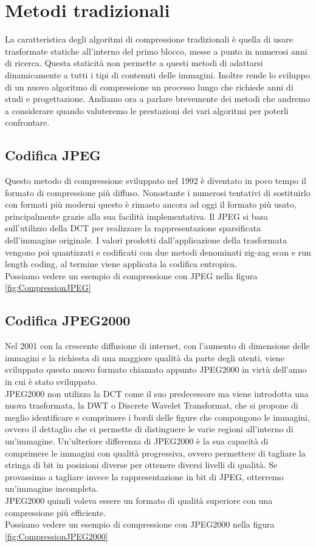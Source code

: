\chapter{Metodi tradizionali}
La caratteristica degli algoritmi di compressione tradizionali è quella di usare trasformate statiche all’interno del primo blocco, messe a punto in numerosi anni di ricerca. Questa staticità non permette a questi metodi di adattarsi dinamicamente a tutti i tipi di contenuti delle immagini. Inoltre rende lo sviluppo di un nuovo algoritmo di compressione un processo lungo che richiede anni di studi e progettazione. \cite{cheng2018deep}
Andiamo ora a parlare brevemente dei metodi che andremo a considerare quando valuteremo le prestazioni dei vari algoritmi per poterli confrontare.

\section{Codifica JPEG}
Questo metodo di compressione sviluppato nel 1992 è diventato in poco tempo il formato di compressione più diffuso. Nonostante i numerosi tentativi di sostituirlo con formati più moderni questo è rimasto ancora ad oggi il formato più usato, principalmente grazie alla sua facilità implementativa. Il JPEG si basa sull’utilizzo della DCT per realizzare la rappresentazione sparsificata dell’immagine originale. I valori prodotti dall'applicazione della trasformata vengono poi quantizzati e codificati con due metodi denominati zig-zag scan e run length coding, al termine viene applicata la codifica entropica. \cite{125072} \\
Possiamo vedere un esempio di compressione con JPEG nella figura \ref{fig:CompressionJPEG}

\section{Codifica JPEG2000}
Nel 2001 con la crescente diffusione di internet, con l’aumento di dimensione delle immagini e la richiesta di una maggiore qualità da parte degli utenti, viene sviluppato questo nuovo formato chiamato appunto JPEG2000 in virtù dell'anno in cui è stato sviluppato.\\
JPEG2000 non utilizza la DCT come il suo predecessore ma viene introdotta una nuova trasformata, la DWT o Discrete Wavelet Transformat, che si propone di meglio identificare e comprimere i bordi delle figure che compongono le immagini, ovvero il dettaglio che ci permette di distinguere le varie regioni all'interno di un’immagine.
Un’ulteriore differenza di JPEG2000 è la sua capacità di comprimere le immagini con qualità progressiva, ovvero permettere di tagliare la stringa di bit in posizioni diverse per ottenere diversi livelli di qualità. Se provassimo a tagliare invece la rappresentazione in bit di JPEG, otterremo un’immagine incompleta.\\
JPEG2000 quindi voleva essere un formato di qualità superiore con una compressione più efficiente.\cite{952804}\\
Possiamo vedere un esempio di compressione con JPEG2000 nella figura \ref{fig:CompressionJPEG2000}

